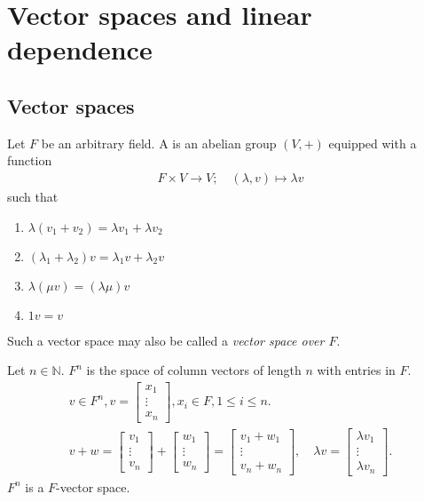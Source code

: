 \section{Vector spaces and linear dependence}

\subsection{Vector spaces}

\begin{definition}
    Let $F$ be an arbitrary field.
    A  is an abelian group $(V, +)$ equipped with a function
    \begin{align*}
        F \times V \to V;\quad (\lambda, v) \mapsto \lambda v
    \end{align*}
    such that
    \begin{enumerate}
        \item $\lambda(v_1 + v_2) = \lambda v_1 + \lambda v_2$
        \item $(\lambda_1 + \lambda_2) v = \lambda_1 v + \lambda_2 v$
        \item $\lambda ( \mu v ) = ( \lambda \mu ) v$
        \item $1 v = v$
    \end{enumerate}
    Such a vector space may also be called a \textit{vector space over $F$}.
\end{definition}

\begin{example}
    Let $n \in \mathbb{N}$.
    $F^n$ is the space of column vectors of length $n$ with entries in $F$.
    \begin{gather*}
        v \in F^n, v = \begin{bmatrix} x_1 \\ \vdots \\ x_n\end{bmatrix}, x_i \in F, 1 \leq i \leq n. \\
        v + w = \begin{bmatrix}v_1 \\ \vdots \\ v_n\end{bmatrix} + \begin{bmatrix}w_1 \\ \vdots \\ w_n\end{bmatrix} = \begin{bmatrix}v_1 + w_1 \\ \vdots \\ v_n + w_n\end{bmatrix},\quad \lambda v = \begin{bmatrix} \lambda v_1 \\ \vdots \\ \lambda v_n\end{bmatrix}.
    \end{gather*}
    $F^n$ is a $F$-vector space.
\end{example}

